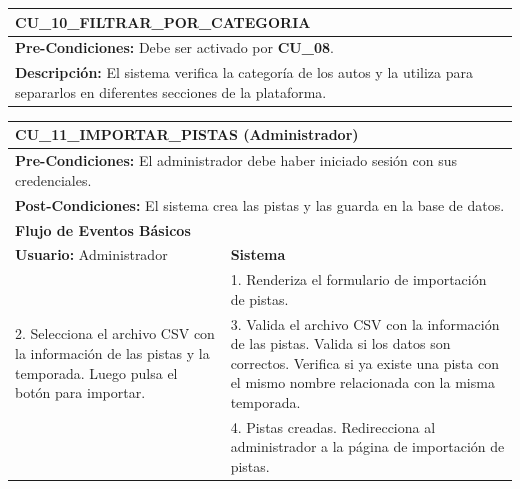 \begin{center}
  \begin{tabular}{| p{7.5cm} | p{7.5cm} |}
    \hline
    \multicolumn{2}{|p{15cm}|}{\textbf{CU\_10\_FILTRAR\_POR\_CATEGORIA}} \\ \hline
    \multicolumn{2}{|p{15cm}|}{\textbf{Pre-Condiciones:} Debe ser activado por \textbf{CU\_08}.} \\ \hline
    \multicolumn{2}{|p{15cm}|}{\textbf{Descripción:} El sistema verifica la categoría de los autos y la utiliza para separarlos en diferentes secciones de la plataforma.} \\
    \hline
  \end{tabular}
\end{center}

%
%

\begin{center}
  \begin{tabular}{| p{7.5cm} | p{7.5cm} |}
    \hline
    \multicolumn{2}{|p{15cm}|}{\textbf{CU\_11\_IMPORTAR\_PISTAS} (Administrador)} \\ \hline
    \multicolumn{2}{|p{15cm}|}{\textbf{Pre-Condiciones:} El administrador debe haber iniciado sesión con sus credenciales.} \\ \hline
    \multicolumn{2}{|p{15cm}|}{\textbf{Post-Condiciones:} El sistema crea las pistas y las guarda en la base de datos.} \\ \hline
    \multicolumn{2}{|p{7.5cm}|}{\textbf{Flujo de Eventos Básicos}} \\ \hline
    \multicolumn{1}{|p{7.5cm}|}{\textbf{Usuario:} Administrador} & \multicolumn{1}{|p{7.5cm}|}{\textbf{Sistema}} \\ \hline
    
    \multicolumn{1}{|p{7.5cm}|}{} & 
    \multicolumn{1}{|p{7.5cm}|}{1. Renderiza el formulario de importación de pistas.}\\ \hline
    
    \multicolumn{1}{|p{7.5cm}|}{2. Selecciona el archivo CSV con la información de las pistas y la temporada. Luego pulsa el botón para importar.}& 
    \multicolumn{1}{|p{7.5cm}|}{3. Valida el archivo CSV con la información de las pistas. Valida si los datos son correctos. Verifica si ya existe una pista con el mismo nombre relacionada con la misma temporada.}\\ \hline
    
    \multicolumn{1}{|p{7.5cm}|}{} & 
    \multicolumn{1}{|p{7.5cm}|}{4. Pistas creadas. Redirecciona al administrador a la página de importación de pistas.}\\ \hline
    

\end{tabular}
\end{center}
